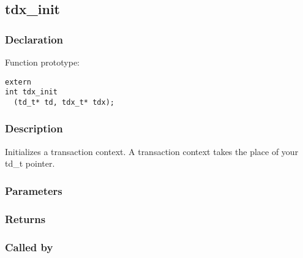 
\newpage
\subsection{tdx\_init}
\subsubsection{Declaration} Function prototype:

\begin{verbatim}
extern
int tdx_init
  (td_t* td, tdx_t* tdx);
\end{verbatim}

\subsubsection{Description}


 Initializes a transaction context.
 A transaction context takes the place of your td\_t pointer.
 

\subsubsection{Parameters}
\subsubsection{Returns}
\subsubsection{Called by}
